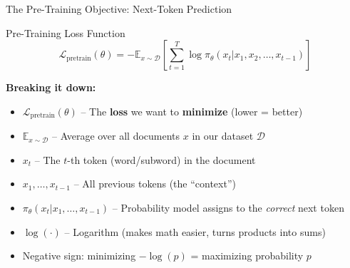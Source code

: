 \documentclass[aspectratio=169,11pt]{beamer}
\newcommand{\highlight}[1]{\textcolor{accentorange}{\textbf{#1}}}
\newcommand{\important}[1]{\textcolor{primaryblue}{\textbf{#1}}}
\begin{document}
\begin{frame}{The Pre-Training Objective: Next-Token Prediction}
\begin{block}{Pre-Training Loss Function}
\[
\mathcal{L}_{\text{pretrain}}(\theta) = -\mathbb{E}_{x \sim \mathcal{D}} \left[ \sum_{t=1}^{T} \log \pi_\theta(x_t | x_1, x_2, \ldots, x_{t-1}) \right]
\]
\end{block}

\textbf{Breaking it down:}
\begin{itemize}
    \item $\mathcal{L}_{\text{pretrain}}(\theta)$ -- The \important{loss} we want to \highlight{minimize} (lower = better)
    \item $\mathbb{E}_{x \sim \mathcal{D}}$ -- Average over all documents $x$ in our dataset $\mathcal{D}$
    \item $x_t$ -- The $t$-th token (word/subword) in the document
    \item $x_1, \ldots, x_{t-1}$ -- All previous tokens (the ``context'')
    \item $\pi_\theta(x_t | x_1, \ldots, x_{t-1})$ -- Probability model assigns to the \textit{correct} next token
    \item $\log(\cdot)$ -- Logarithm (makes math easier, turns products into sums)
    \item Negative sign: minimizing $-\log(p)$ = maximizing probability $p$
\end{itemize}
\end{frame}
\end{document}
